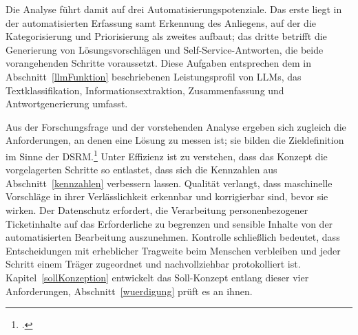 Die Analyse f\"uhrt damit auf drei Automatisierungspotenziale. Das erste liegt in der automatisierten Erfassung samt Erkennung des Anliegens, auf der die Kategorisierung und Priorisierung als zweites aufbaut; das dritte betrifft die Generierung von L\"osungsvorschl\"agen und Self-Service-Antworten, die beide vorangehenden Schritte voraussetzt. Diese Aufgaben entsprechen dem in Abschnitt~\ref{llmFunktion} beschriebenen Leistungsprofil von LLMs, das Textklassifikation, Informationsextraktion, Zusammenfassung und Antwortgenerierung umfasst.

Aus der Forschungsfrage und der vorstehenden Analyse ergeben sich zugleich die Anforderungen, an denen eine L\"osung zu messen ist; sie bilden die Zieldefinition im Sinne der DSRM.\footcite[Vgl.][S.~55]{Peffers2007} Unter Effizienz ist zu verstehen, dass das Konzept die vorgelagerten Schritte so entlastet, dass sich die Kennzahlen aus Abschnitt~\ref{kennzahlen} verbessern lassen. Qualit\"at verlangt, dass maschinelle Vorschl\"age in ihrer Verl\"asslichkeit erkennbar und korrigierbar sind, bevor sie wirken. Der Datenschutz erfordert, die Verarbeitung personenbezogener Ticketinhalte auf das Erforderliche zu begrenzen und sensible Inhalte von der automatisierten Bearbeitung auszunehmen. Kontrolle schlie{\ss}lich bedeutet, dass Entscheidungen mit erheblicher Tragweite beim Menschen verbleiben und jeder Schritt einem Tr\"ager zugeordnet und nachvollziehbar protokolliert ist. Kapitel~\ref{sollKonzeption} entwickelt das Soll-Konzept entlang dieser vier Anforderungen, Abschnitt~\ref{wuerdigung} pr\"uft es an ihnen.
